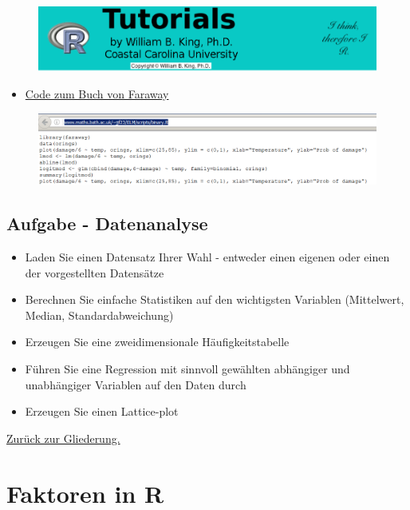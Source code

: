 \documentclass[]{article}
\providecommand{\tightlist}{%
  \setlength{\itemsep}{0pt}\setlength{\parskip}{0pt}}
\begin{document}
\begin{figure}[htbp]
\centering
\includegraphics{figure/Rtutorials.PNG}
\caption{}
\end{figure}

\begin{itemize}
\tightlist
\item
  \href{http://www.maths.bath.ac.uk/~jjf23/ELM/scripts/binary.R}{Code
  zum Buch von Faraway}
\end{itemize}

\begin{figure}[htbp]
\centering
\includegraphics{figure/orings.PNG}
\caption{}
\end{figure}

\subsection{Aufgabe - Datenanalyse}\label{aufgabe---datenanalyse}

\begin{itemize}
\tightlist
\item
  Laden Sie einen Datensatz Ihrer Wahl - entweder einen eigenen oder
  einen der vorgestellten Datensätze
\item
  Berechnen Sie einfache Statistiken auf den wichtigsten Variablen
  (Mittelwert, Median, Standardabweichung)
\item
  Erzeugen Sie eine zweidimensionale Häufigkeitstabelle
\item
  Führen Sie eine Regression mit sinnvoll gewählten abhängiger und
  unabhängiger Variablen auf den Daten durch
\item
  Erzeugen Sie einen Lattice-plot
\end{itemize}

\href{https://github.com/Japhilko/IntroR/blob/master/2016/README.md}{Zurück
zur Gliederung.}

\section{Faktoren in R}\label{faktoren-in-r}
\end{document}
